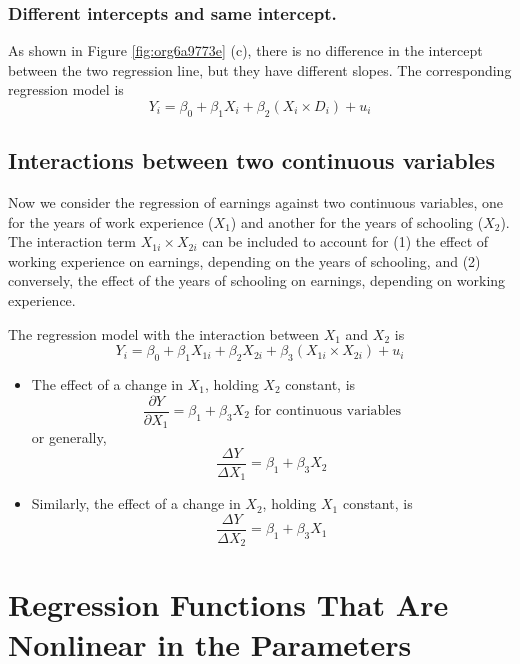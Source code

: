 \documentclass[a4paper,11pt]{article}
\begin{document}
\subsubsection*{Different intercepts and same intercept.}
\label{sec:org6c3cc9b}
As shown in Figure \ref{fig:org6a9773e} (c), there is no difference in the
intercept between the two regression line, but they have different
slopes. The corresponding regression model is
\begin{equation}
\label{eq:interact-dx-c}
Y_i = \beta_0 + \beta_1 X_i + \beta_2 (X_i \times D_i) + u_i
\end{equation}

\subsection{Interactions between two continuous variables}
\label{sec:org0e7363b}
Now we consider the regression of earnings against two continuous
variables, one for the years of work experience (\(X_1\)) and another
for the years of schooling (\(X_2\)). The interaction term \(X_{1i}
\times X_{2i}\) can be included to account for (1) the effect of
working experience on earnings, depending on the years of schooling,
and (2) conversely, the effect of the years of schooling on earnings,
depending on working experience.

The regression model with the interaction between \(X_1\) and \(X_2\) is
\begin{equation}
\label{eq:interact-xx}
Y_i = \beta_0 + \beta_1 X_{1i} + \beta_2 X_{2i} + \beta_3 (X_{1i} \times X_{2i}) + u_i
\end{equation}

\begin{itemize}
\item The effect of a change in \(X_1\), holding \(X_2\) constant, is
\[ \frac{\partial Y}{\partial X_1} = \beta_1 + \beta_3 X_2 \text{ for
  continuous variables} \]
or generally,
\[ \frac{\Delta Y}{\Delta X_1} = \beta_1 + \beta_3 X_2 \]
\item Similarly, the effect of a change in \(X_2\), holding \(X_1\) constant, is
\[ \frac{\Delta Y}{\Delta X_2} = \beta_1 + \beta_3 X_1 \]
\end{itemize}

\section{Regression Functions That Are Nonlinear in the Parameters}
\label{sec:orgf1d66fc}
\end{document}
